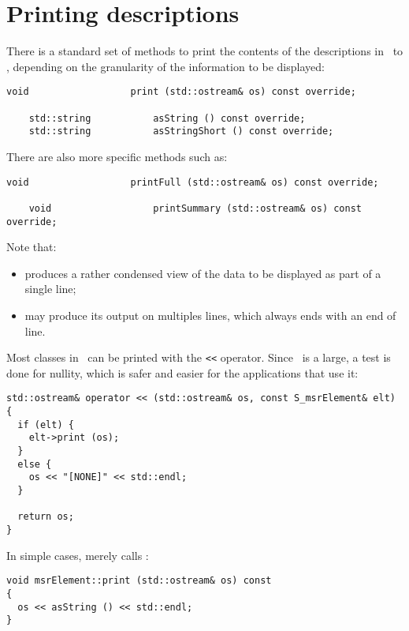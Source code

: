 \section{Printing descriptions}

There is a standard set of methods to print the contents of the descriptions in \mf\ to \standardOutput, depending on the granularity of the information to be displayed:
\begin{lstlisting}[language=CPlusPlus]
    void                  print (std::ostream& os) const override;

    std::string           asString () const override;
    std::string           asStringShort () const override;
\end{lstlisting}

There are also more specific methods such as:
\begin{lstlisting}[language=CPlusPlus]
    void                  printFull (std::ostream& os) const override;

    void                  printSummary (std::ostream& os) const override;
\end{lstlisting}

Note that:
\begin{itemize}
\item {} produces a rather condensed view of the data to be displayed as part of a single line;
\item {} may produce its output on multiples lines, which always ends with an end of line.
\end{itemize}

Most classes in \mf\ can be printed with the {\tt <<} operator. Since \mf\ is a large, a test is done for nullity, which is safer and easier for the applications that use it:
\begin{lstlisting}[language=CPlusPlus]
std::ostream& operator << (std::ostream& os, const S_msrElement& elt)
{
  if (elt) {
    elt->print (os);
  }
  else {
    os << "[NONE]" << std::endl;
  }

  return os;
}
\end{lstlisting}

In simple cases,  merely calls :
\begin{lstlisting}[language=CPlusPlus]
void msrElement::print (std::ostream& os) const
{
  os << asString () << std::endl;
}
\end{lstlisting}

